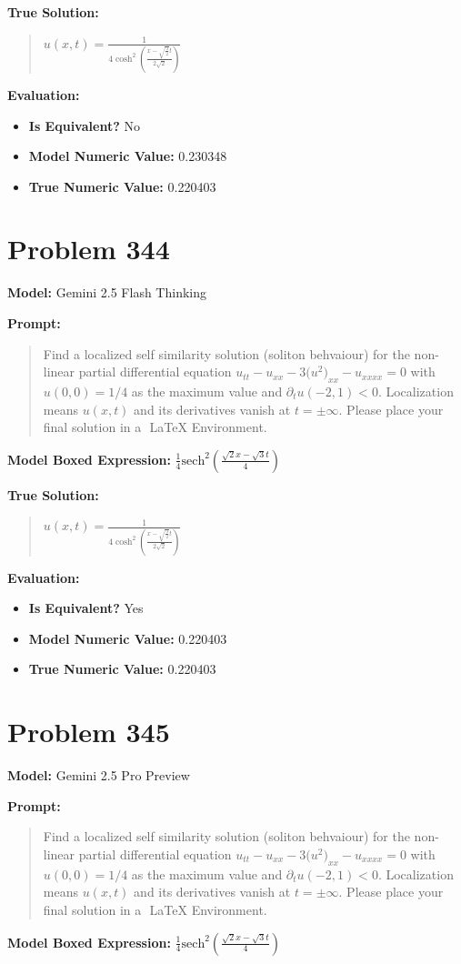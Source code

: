 \documentclass{article}
\begin{document}
{\textbf{True Solution:}
\begin{quote}
$u(x, t) = \frac{1}{4\cosh^2(\frac{x-\sqrt{\frac{3}{2}}t}{2\sqrt{2}})}$
\end{quote}

\textbf{Evaluation:}
\begin{itemize}
\item \textbf{Is Equivalent?} No
\item \textbf{Model Numeric Value:} 0.230348
\item \textbf{True Numeric Value:} 0.220403
\end{itemize}
\vspace{1cm}
\section*{Problem 344}
\textbf{Model:} Gemini 2.5 Flash Thinking

\textbf{Prompt:}
\begin{quote}
Find a localized self similarity solution (soliton behvaiour) for the non-linear partial differential equation $u_{tt}-u_{xx}-3\bigl(u^{2}\bigr)_{xx}-u_{xxxx}=0$ with $u(0, 0) = 1/4$ as the maximum value and $\partial_t u(-2, 1) < 0$. Localization means $u(x,t)$ and its derivatives vanish at $t= \pm \infty$. Please place your final solution in a $\boxed{}$ LaTeX Environment.
\end{quote}
\textbf{Model Boxed Expression:} $\frac{1}{4} \text{sech}^2\left(\frac{\sqrt{2}x - \sqrt{3}t}{4}\right)$

\textbf{True Solution:}
\begin{quote}
$u(x, t) = \frac{1}{4\cosh^2(\frac{x-\sqrt{\frac{3}{2}}t}{2\sqrt{2}})}$
\end{quote}

\textbf{Evaluation:}
\begin{itemize}
\item \textbf{Is Equivalent?} Yes
\item \textbf{Model Numeric Value:} 0.220403
\item \textbf{True Numeric Value:} 0.220403
\end{itemize}
\vspace{1cm}
\section*{Problem 345}
\textbf{Model:} Gemini 2.5 Pro Preview

\textbf{Prompt:}
\begin{quote}
Find a localized self similarity solution (soliton behvaiour) for the non-linear partial differential equation $u_{tt}-u_{xx}-3\bigl(u^{2}\bigr)_{xx}-u_{xxxx}=0$ with $u(0, 0) = 1/4$ as the maximum value and $\partial_t u(-2, 1) < 0$. Localization means $u(x,t)$ and its derivatives vanish at $t= \pm \infty$. Please place your final solution in a $\boxed{}$ LaTeX Environment.
\end{quote}
\textbf{Model Boxed Expression:} $\frac{1}{4}\text{sech}^2\left(\frac{\sqrt{2}x-\sqrt{3}t}{4}\right)$

}
\end{document}
